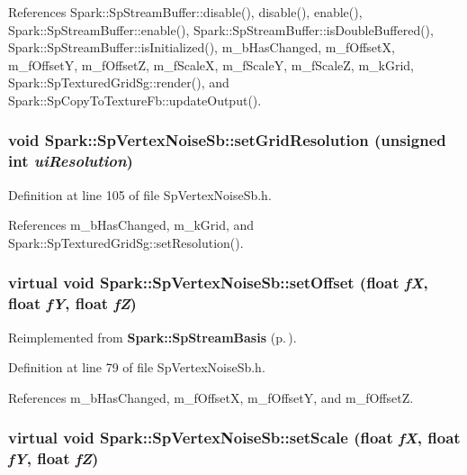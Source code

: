 References Spark::Sp\-Stream\-Buffer::disable(), disable(), enable(), Spark::Sp\-Stream\-Buffer::enable(), Spark::Sp\-Stream\-Buffer::is\-Double\-Buffered(), Spark::Sp\-Stream\-Buffer::is\-Initialized(), m\_\-b\-Has\-Changed, m\_\-f\-Offset\-X, m\_\-f\-Offset\-Y, m\_\-f\-Offset\-Z, m\_\-f\-Scale\-X, m\_\-f\-Scale\-Y, m\_\-f\-Scale\-Z, m\_\-k\-Grid, Spark::Sp\-Textured\-Grid\-Sg::render(), and Spark::Sp\-Copy\-To\-Texture\-Fb::update\-Output().
\subsubsection{\setlength{\rightskip}{0pt plus 5cm}void Spark::Sp\-Vertex\-Noise\-Sb::set\-Grid\-Resolution (unsigned int {\em ui\-Resolution})\hspace{0.3cm}{\tt  [inline]}}\label{classSpark_1_1SpVertexNoiseSb_a13}


Definition at line 105 of file Sp\-Vertex\-Noise\-Sb.h.

References m\_\-b\-Has\-Changed, m\_\-k\-Grid, and Spark::Sp\-Textured\-Grid\-Sg::set\-Resolution().
\subsubsection{\setlength{\rightskip}{0pt plus 5cm}virtual void Spark::Sp\-Vertex\-Noise\-Sb::set\-Offset (float {\em f\-X}, float {\em f\-Y}, float {\em f\-Z})\hspace{0.3cm}{\tt  [inline, virtual]}}\label{classSpark_1_1SpVertexNoiseSb_a9}




Reimplemented from {\bf Spark::Sp\-Stream\-Basis} {\rm (p.\,\pageref{classSpark_1_1SpStreamBasis_a6})}.

Definition at line 79 of file Sp\-Vertex\-Noise\-Sb.h.

References m\_\-b\-Has\-Changed, m\_\-f\-Offset\-X, m\_\-f\-Offset\-Y, and m\_\-f\-Offset\-Z.
\subsubsection{\setlength{\rightskip}{0pt plus 5cm}virtual void Spark::Sp\-Vertex\-Noise\-Sb::set\-Scale (float {\em f\-X}, float {\em f\-Y}, float {\em f\-Z})\hspace{0.3cm}{\tt  [inline, virtual]}}\label{classSpark_1_1SpVertexNoiseSb_a7}




